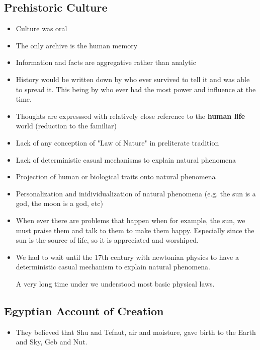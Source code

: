 \documentclass{article}
\begin{document}
\subsection{Prehistoric Culture}
\begin{itemize}
  \item Culture was oral
  \item The only archive is the human memory
  \item Information and facts are aggregative rather than analytic
  \item History would be written down by who ever survived to tell
    it and was able to spread it.
    This being by who ever had the most power and influence at the
    time.
  \item Thoughts are expresssed with relatively close reference to the \textbf{human life} world
    (reduction to the familiar)
  \item Lack of any conception of "Law of Nature"
    in preliterate tradition
  \item Lack of deterministic casual mechanisms to explain natural phenomena
  \item Projection of human or biological traits onto natural phenomena
  \item Personalization and inidividualization of natural phenomena
    (e.g. the sun is a god, the moon is a god, etc)
  \item When ever there are problems that happen when for example, the sun,
    we must praise them and talk to them to make them happy.
    Especially since the sun is the source of life, so it is
    appreciated and worshiped.
  \item We had to wait until the 17th century with newtonian physics
    to have a deterministic casual mechanism to explain natural phenomena.

    A very long time under we understood most basic physical laws.
\end{itemize}

\subsection{Egyptian Account of Creation}
\begin{itemize}
  \item They believed that Shu and Tefnut, air and moisture,
    gave birth to the Earth and Sky, Geb and Nut.
\end{itemize}
\end{document}
